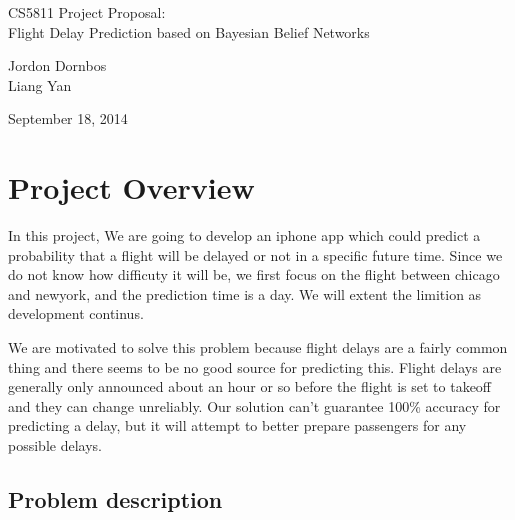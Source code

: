 \documentclass[12pt]{article}
\begin{document}
\begin{center}
{\large CS5811 Project Proposal:}\\
{\large Flight Delay Prediction based on Bayesian Belief Networks}

{\small Jordon Dornbos\\}
{\small Liang Yan\\}

{\small September 18, 2014\\}

\end{center}

\section{Project Overview}


In this project, We are going to develop an iphone app which could
predict a probability that a flight will be delayed or not in a
specific future time. Since we do not know how difficuty it will be,
we first focus on the flight between chicago and newyork, and the
prediction time is a day. We will extent the limition as development continus.  
 
We are motivated to solve this problem because flight delays are a
fairly common thing and there seems to be no good source for
predicting this. Flight delays are generally only announced about an
hour or so before the flight is set to takeoff and they can change
unreliably. Our solution can't guarantee 100\% accuracy for predicting
a delay, but it will attempt to better prepare passengers for any
possible delays. 

\subsection{Problem description}
\label{sec:problem-desc}
\end{document}
